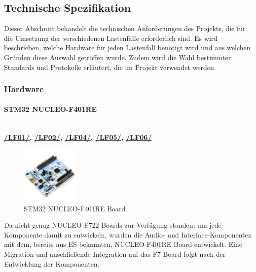 \newpage
\subsection{Technische Spezifikation}
Dieser Abschnitt behandelt die technischen Anforderungen des Projekts, die für die Umsetzung der verschiedenen Lastenfälle erforderlich sind. Es wird beschrieben, welche Hardware für jeden Lastenfall benötigt wird und aus welchen Gründen diese Auswahl getroffen wurde. Zudem wird die Wahl bestimmter Standards und Protokolle erläutert, die im Projekt verwendet werden.

\subsubsection{Hardware}






\newpage
\paragraph{STM32 NUCLEO-F401RE}\label{sec:stm32-nucleo-f401re}\mbox{}\\

\textbf{{\hyperlink{LF01_Link}{/LF01/}, \hyperlink{LF02_Link}{/LF02/}, \hyperlink{lf-audiorecord}{/LF04/}, \hyperlink{lf-audioplayback}{/LF05/}, \hyperlink{lf-pitchaudio}{/LF06/}}}

\begin{figure} %
	\vspace{-10pt}
	\hspace{20pt}
	\centering
	\includegraphics[width=0.25\textwidth]{images/05_technische_spezifikation/NUCLEO-F401RE.jpg}
	\caption{STM32 NUCLEO-F401RE Board}
	\label{fig:nucleo-f401re}
\end{figure}

\vspace{1em}

Da nicht genug NUCLEO-F722 Boards zur Verfügung standen, um jede Komponente damit zu entwickeln, wurden die Audio- und Interface-Komponenten mit dem, bereits aus ES bekannten, NUCLEO-F401RE Board entwickelt. Eine Migration und anschließende Integration auf das F7 Board folgt nach der Entwicklung der Komponenten.


